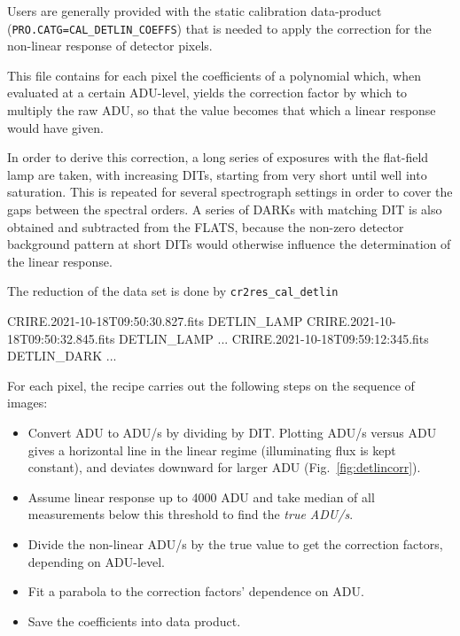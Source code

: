 Users are generally provided with the static calibration data-product
(\verb!PRO.CATG=CAL_DETLIN_COEFFS!) that is needed to apply the correction for
the non-linear response of detector pixels.

This file contains for each pixel the coefficients of a polynomial which, when
evaluated at a certain ADU-level, yields the correction factor by which to
multiply the raw ADU, so that the value becomes that which a linear response
would have given.

In order to derive this correction, a long series of exposures with the
flat-field lamp are taken, with increasing DITs, starting from very short until
well into saturation. This is repeated for several spectrograph settings in
order to cover the gaps between the spectral orders. A series of DARKs with
matching DIT is also obtained and subtracted from the FLATS, because the
non-zero detector background pattern at short DITs would otherwise influence the
determination of the linear response.

The reduction of the data set is done by \verb!cr2res_cal_detlin!
\begin{shell}[fontsize=\footnotesize]
    CRIRE.2021-10-18T09:50:30.827.fits DETLIN_LAMP
    CRIRE.2021-10-18T09:50:32.845.fits DETLIN_LAMP
    ...
    CRIRE.2021-10-18T09:59:12:345.fits DETLIN_DARK
    ...

\end{shell}

For each pixel, the recipe carries out the following steps on the sequence of images:
\begin{itemize}
    \item Convert ADU to ADU/s by dividing by DIT. Plotting ADU/s versus ADU
    gives a horizontal line in the linear regime (illuminating flux is kept
    constant), and deviates downward for larger ADU (Fig.~\ref{fig:detlincorr}).
    \item Assume linear response up to 4000 ADU and take median of all
    measurements below this threshold to find the \emph{true ADU/s}.
    \item Divide the non-linear ADU/s by the true value to get the correction
    factors, depending on ADU-level.
    \item Fit a parabola to the correction factors' dependence on ADU.
    \item Save the coefficients into data product.
\end{itemize}

